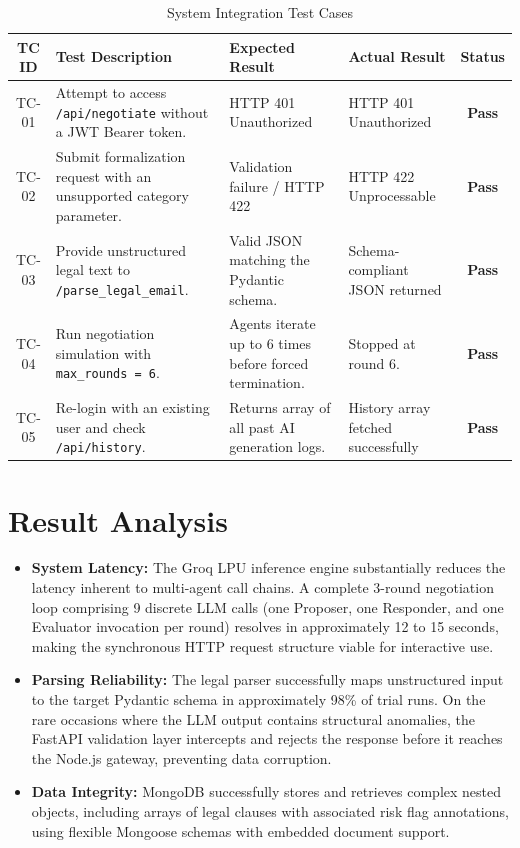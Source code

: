 \documentclass[12pt,a4paper]{report}
\begin{document}
\begin{table}[ht]
	\centering
	\renewcommand{\arraystretch}{1.5}
	\small
	\begin{tabularx}{\textwidth}{|c|X|X|X|c|}
		\hline
		\textbf{TC ID} & \textbf{Test Description}                                             & \textbf{Expected Result}                                & \textbf{Actual Result}             & \textbf{Status} \\
		\hline
		TC-01          & Attempt to access \texttt{/api/negotiate} without a JWT Bearer token. & HTTP 401 Unauthorized                                   & HTTP 401 Unauthorized              & \textbf{Pass}   \\
		\hline
		TC-02          & Submit formalization request with an unsupported category parameter.  & Validation failure / HTTP 422                           & HTTP 422 Unprocessable             & \textbf{Pass}   \\
		\hline
		TC-03          & Provide unstructured legal text to \texttt{/parse\_legal\_email}.     & Valid JSON matching the Pydantic schema.                & Schema-compliant JSON returned     & \textbf{Pass}   \\
		\hline
		TC-04          & Run negotiation simulation with \texttt{max\_rounds = 6}.             & Agents iterate up to 6 times before forced termination. & Stopped at round 6.                & \textbf{Pass}   \\
		\hline
		TC-05          & Re-login with an existing user and check \texttt{/api/history}.       & Returns array of all past AI generation logs.           & History array fetched successfully & \textbf{Pass}   \\
		\hline
	\end{tabularx}
	\caption{System Integration Test Cases}
	\label{tab:testcases}
\end{table}

\section{Result Analysis}
\begin{itemize}
	\item \textbf{System Latency:} The Groq LPU inference engine substantially reduces the latency inherent to multi-agent call chains. A complete 3-round negotiation loop comprising 9 discrete LLM calls (one Proposer, one Responder, and one Evaluator invocation per round) resolves in approximately 12 to 15 seconds, making the synchronous HTTP request structure viable for interactive use.
	\item \textbf{Parsing Reliability:} The legal parser successfully maps unstructured input to the target Pydantic schema in approximately 98\% of trial runs. On the rare occasions where the LLM output contains structural anomalies, the FastAPI validation layer intercepts and rejects the response before it reaches the Node.js gateway, preventing data corruption.
	\item \textbf{Data Integrity:} MongoDB successfully stores and retrieves complex nested objects, including arrays of legal clauses with associated risk flag annotations, using flexible Mongoose schemas with embedded document support.
\end{itemize}
\end{document}
